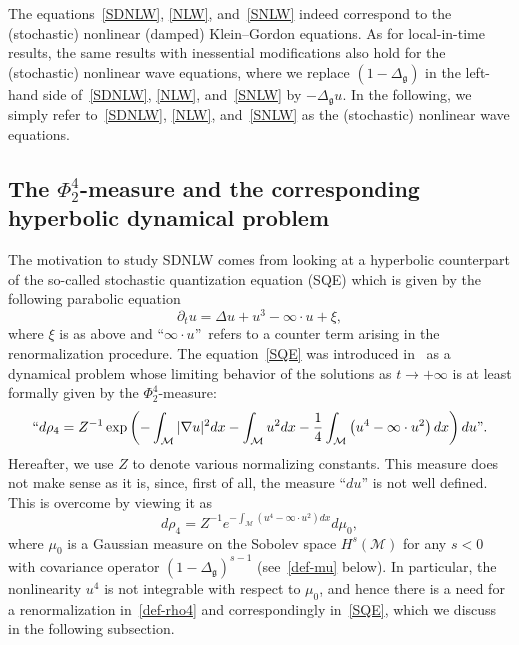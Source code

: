 \documentclass[AHL,Unicode,longabstracts,published]{cedram}
\newcommand{\M}{\mathcal{M}}
\newcommand{\g}{\mathfrak{g}}
\newcommand{\Dlg}{\Delta_{\g}}
\newcommand{\Dl}{\Delta}
\newcommand{\dt}{\partial_t}
\begin{document}
\begin{rema}
The equations~\eqref{SDNLW}, \eqref{NLW}, and~\eqref{SNLW} indeed correspond to the (stochastic) nonlinear (damped) Klein--Gordon equations. As for local-in-time results, the same results with inessential modifications also hold for the (stochastic) nonlinear wave equations, where we replace $(1-\Dlg)$ in the left-hand side of~\eqref{SDNLW}, \eqref{NLW}, and~\eqref{SNLW} by $- \Dlg u$. In the following, we simply refer to~\eqref{SDNLW}, \eqref{NLW}, and~\eqref{SNLW} as the (stochastic) nonlinear wave equations.
\end{rema}


\subsection{The \texorpdfstring{$\Phi^4_2$}{Phi42}-measure and the corresponding hyperbolic dynamical problem}
The motivation to study SDNLW comes from looking at a hyperbolic counterpart of the so-called stochastic quantization equation (SQE) which is given by the following parabolic equation
\begin{equation}\label{SQE}
\dt u = \Dl u + u^3 - \infty\cdot u + \xi,
\end{equation}
where $\xi$ is as above and ``$\infty\cdot u$''~refers to a counter term arising in the renormalization procedure. The equation~\eqref{SQE} was introduced in~\cite{PW} as a dynamical problem whose limiting behavior of the solutions as $t\rightarrow +\infty$ is at least formally given by the $\Phi^4_2$-measure:
\begin{equation*}
``d\rho_4 = Z^{-1}\exp\left(-\int_{\M}|\nabla u|^2 dx -\int_{\M}u^2 dx -\frac{1}{4}\int_{\M}\left(u^4-\infty\cdot u^2\right) dx\right)du".
\end{equation*}
Hereafter, we use $Z$ to denote various normalizing constants. This measure does not make sense as it is, since, first of all, the measure ``$du$'' is not well defined. This is overcome by viewing it as
\begin{equation}\label{def-rho4}
d\rho_4 = Z^{-1}e^{-\int_{\M}\left(u^4-\infty\cdot u^2\right) dx}d\mu_0,
\end{equation}
where $\mu_0$ is a Gaussian measure on the Sobolev space $H^s(\M)$ for any $s<0$ with covariance operator $(1-\Dlg)^{s-1}$ (see~\eqref{def-mu} below). In particular, the nonlinearity $u^4$ is not integrable with respect to $\mu_0$, and hence there is a need for a renormalization in~\eqref{def-rho4} and correspondingly in~\eqref{SQE}, which we discuss in the following subsection.
\end{document}
